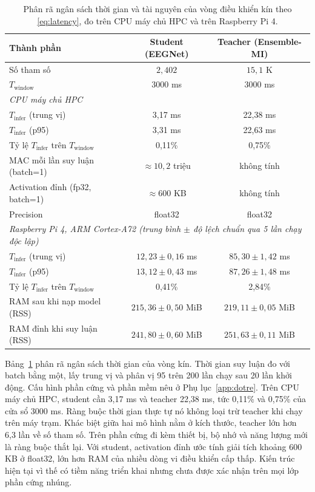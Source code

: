\begin{table}[!htbp]
\centering
\caption{Phân rã ngân sách thời gian và tài nguyên của vòng điều khiển
kín theo \eqref{eq:latency}, đo trên CPU máy chủ HPC và trên Raspberry
Pi 4.}
\label{tab:tre}
\begin{tabular}{lcc}
\toprule
\textbf{Thành phần} & \textbf{Student (EEGNet)} & \textbf{Teacher (Ensemble-MI)} \\
\midrule
Số tham số & $2{,}402$ & $15{,}1$ K \\
$T_{\mathrm{window}}$ & 3000 ms & 3000 ms \\
\midrule
\multicolumn{3}{l}{\textit{CPU máy chủ HPC}} \\
$T_{\mathrm{infer}}$ (trung vị) & 3,17 ms & 22,38 ms \\
$T_{\mathrm{infer}}$ (p95) & 3,31 ms & 22,63 ms \\
Tỷ lệ $T_{\mathrm{infer}}$ trên $T_{\mathrm{window}}$ & 0,11\% & 0,75\% \\
MAC mỗi lần suy luận (batch=1) & $\approx 10{,}2$ triệu & không tính \\
Activation đỉnh (fp32, batch=1) & $\approx 600$ KB & không tính \\
Precision & float32 & float32 \\
\midrule
\multicolumn{3}{l}{\textit{Raspberry Pi 4, ARM Cortex-A72 (trung bình
$\pm$ độ lệch chuẩn qua 5 lần chạy độc lập)}} \\
$T_{\mathrm{infer}}$ (trung vị) & $12{,}23 \pm 0{,}16$ ms & $85{,}30 \pm 1{,}42$ ms \\
$T_{\mathrm{infer}}$ (p95) & $13{,}12 \pm 0{,}43$ ms & $87{,}26 \pm 1{,}48$ ms \\
Tỷ lệ $T_{\mathrm{infer}}$ trên $T_{\mathrm{window}}$ & 0,41\% & 2,84\% \\
RAM sau khi nạp model (RSS) & $215{,}36 \pm 0{,}50$ MiB & $219{,}11 \pm 0{,}05$ MiB \\
RAM đỉnh khi suy luận (RSS) & $241{,}80 \pm 0{,}60$ MiB & $251{,}63 \pm 0{,}11$ MiB \\
\bottomrule
\end{tabular}
\end{table}
\FloatBarrier

Bảng~\ref{tab:tre} phân rã ngân sách thời gian của vòng kín. Thời gian suy
luận đo với batch bằng một, lấy trung vị và phân vị 95 trên 200 lần chạy
sau 20 lần khởi động. Cấu hình phần cứng và phần mềm nêu ở
Phụ lục~\ref{app:dotre}. Trên CPU máy chủ HPC, student cần 3,17 ms và
teacher 22,38 ms, tức 0,11\% và 0,75\% của cửa sổ 3000 ms. Ràng buộc thời
gian thực tự nó không loại trừ teacher khi chạy trên máy trạm. Khác biệt
giữa hai mô hình nằm ở kích thước, teacher lớn hơn 6,3 lần về số tham số.
Trên phần cứng đi kèm thiết bị, bộ nhớ và năng lượng mới là ràng buộc thắt
lại. Với student, activation đỉnh ước tính giải tích khoảng 600 KB ở
float32, lớn hơn RAM của nhiều dòng vi điều khiển cấp thấp. Kiến trúc hiện
tại vì thế có tiềm năng triển khai nhưng chưa được xác nhận trên mọi lớp
phần cứng nhúng.

